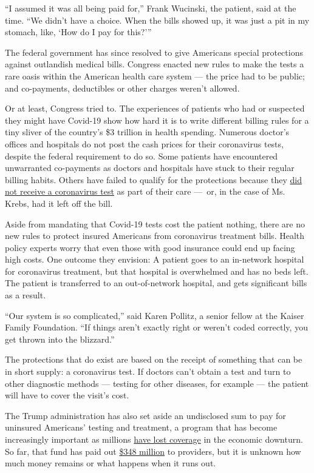 ``I assumed it was all being paid for,'' Frank Wucinski, the patient,
said at the time. ``We didn't have a choice. When the bills showed up,
it was just a pit in my stomach, like, `How do I pay for this?'''

The federal government has since resolved to give Americans special
protections against outlandish medical bills. Congress enacted new rules
to make the tests a rare oasis within the American health care system
--- the price had to be public; and co-payments, deductibles or other
charges weren't allowed.

Or at least, Congress tried to. The experiences of patients who had or
suspected they might have Covid-19 show how hard it is to write
different billing rules for a tiny sliver of the country's \$3 trillion
in health spending. Numerous doctor's offices and hospitals do not post
the cash prices for their coronavirus tests, despite the federal
requirement to do so. Some patients have encountered unwarranted
co-payments as doctors and hospitals have stuck to their regular billing
habits. Others have failed to qualify for the protections because they
\href{https://khn.org/news/bill-of-the-month-covid19-tests-are-free-except-when-theyre-not/}{did
not receive a coronavirus test} as part of their care ---~or, in the
case of Ms. Krebs, had it left off the bill.

Aside from mandating that Covid-19 tests cost the patient nothing, there
are no new rules to protect insured Americans from coronavirus treatment
bills. Health policy experts worry that even those with good insurance
could end up facing high costs. One outcome they envision: A patient
goes to an in-network hospital for coronavirus treatment, but that
hospital is overwhelmed and has no beds left. The patient is transferred
to an out-of-network hospital, and gets significant bills as a result.

``Our system is so complicated,'' said Karen Pollitz, a senior fellow at
the Kaiser Family Foundation. ``If things aren't exactly right or
weren't coded correctly, you get thrown into the blizzard.''

The protections that do exist are based on the receipt of something that
can be in short supply: a coronavirus test. If doctors can't obtain a
test and turn to other diagnostic methods --- testing for other
diseases, for example --- the patient will have to cover the visit's
cost.

The Trump administration has also set aside an undisclosed sum to pay
for uninsured Americans' testing and treatment, a program that has
become increasingly important as millions
\href{https://www.nytimes.com/2020/07/13/us/politics/coronavirus-health-insurance-trump.html}{have
lost coverage} in the economic downturn. So far, that fund has paid out
\href{https://data.cdc.gov/Administrative/Claims-Reimbursement-to-Health-Care-Providers-and-/rksx-33p3}{\$348
million} to providers, but it is unknown how much money remains or what
happens when it runs out.

